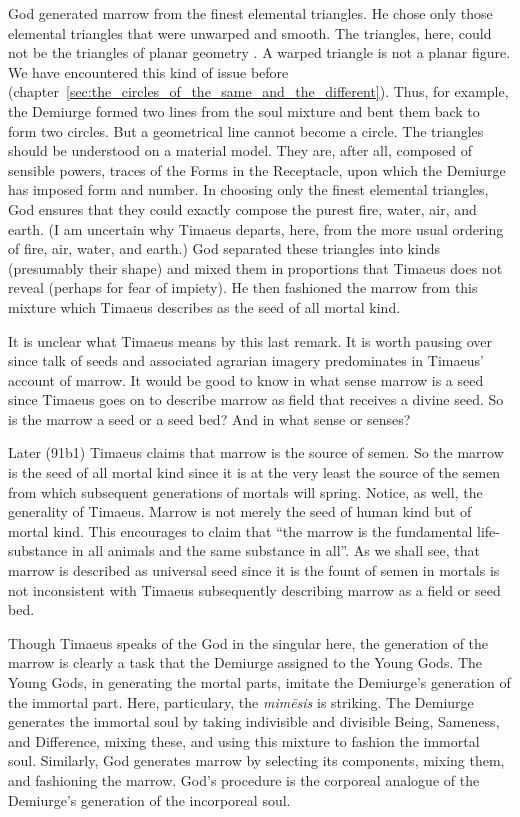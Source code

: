 God generated marrow from the finest elemental triangles. He chose only those elemental triangles that were unwarped and smooth. The triangles, here, could not be the triangles of planar geometry \citep[293 n2]{Cornford:1935fk}. A warped triangle is not a planar figure. We have encountered this kind of issue before (chapter~\ref{sec:the_circles_of_the_same_and_the_different}). Thus, for example, the Demiurge formed two lines from the soul mixture and bent them back to form two circles. But a geometrical line cannot become a circle. The triangles should be understood on a material model. They are, after all, composed of sensible powers, traces of the Forms in the Receptacle, upon which the Demiurge has imposed form and number. In choosing only the finest elemental triangles, God ensures that they could exactly compose the purest fire, water, air, and earth. (I am uncertain why Timaeus departs, here, from the more usual ordering of fire, air, water, and earth.) God separated these triangles into kinds (presumably their shape) and mixed them in proportions that Timaeus does not reveal (perhaps for fear of impiety). He then fashioned the marrow from this mixture which Timaeus describes as the seed of all mortal kind. 

It is unclear what Timaeus means by this last remark. It is worth pausing over since talk of seeds and associated agrarian imagery predominates in Timaeus' account of marrow. It would be good to know in what sense marrow is a seed since Timaeus goes on to describe marrow as field that receives a divine seed. So is the marrow a seed or a seed bed? And in what sense or senses?

Later (91b1) Timaeus claims that marrow is the source of semen. So the marrow is the seed of all mortal kind since it is at the very least the source of the semen from which subsequent generations of mortals will spring. Notice, as well, the generality of Timaeus. Marrow is not merely the seed of human kind \citep[73]{Waterfield:2008lx} but of mortal kind. This encourages \citet[295]{Cornford:1935fk} to claim that ``the marrow is the fundamental life-substance in all animals and the same substance in all''. As we shall see, that marrow is described as universal seed since it is the fount of semen in mortals is not inconsistent with Timaeus subsequently describing marrow as a field or seed bed.

Though Timaeus speaks of the God in the singular here, the generation of the marrow is clearly a task that the Demiurge assigned to the Young Gods. The Young Gods, in generating the mortal parts, imitate the Demiurge's generation of the immortal part. Here, particulary, the \emph{mimēsis} is striking. The Demiurge generates the immortal soul by taking indivisible and divisible Being, Sameness, and Difference, mixing these, and using this mixture to fashion the immortal soul. Similarly, God generates marrow by selecting its components, mixing them, and fashioning the marrow. God's procedure is the corporeal analogue of the Demiurge's generation of the incorporeal soul.

